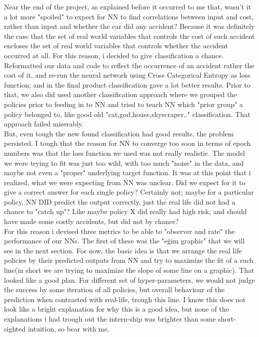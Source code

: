 \documentclass[titlepage, a4paper, 14pt]{extarticle} %
\begin{document}
Near the end of the project, as explained before it occurred to me that, wasn't it a lot more "spoiled" to expect for NN to find correlations between input and cost, rather than input and whether the car did any accident? Because it was definitely the case that the set of real world variables that controls the cost of such accident encloses the set of real world variables that controls whether the accident occurred at all. For this reason, i decided to give classification a chance. Reformatted our data and code to reflect the occurrence of an accident rather the cost of it, and re-run the neural network using Cross Categorical Entropy as loss function; and in the final product classification gave a lot better results. Prior to that, we also did used another classification approach where we grouped the policies prior to feeding in to NN and tried to teach NN which "prior group" a policy belonged to, like good old "cat,god,house,skyscraper.." classification. That approach failed miserably.\\

But, even tough the new found classification had good results, the problem persisted. I tough that the reason for NN to converge too soon in terms of epoch numbers was that the loss function we used was not really realistic. The model we were trying to fit was just too wild, with too much "noise" in the data, and maybe not even a "proper" underlying target function. It was at this point that i realized, what we were expecting from NN was unclear. Did we expect for it to give a correct answer for each single policy? Certainly not; maybe for a particular policy, NN DID predict the output correctly, just the real life did not had a chance to "catch up"? Like maybe policy X did really had high risk, and should have made some costly accidents, but did not by chance?\\

For this reason i devised three metrics to be able to "observer and rate" the performance of our NNs. The first of these was the "eğim graphic" that we will see in the next section. For now, the basic idea is that we arrange the real life policies by their predicted outputs from NN and try to maximize the fit of a such line(in short we are trying to maximize the slope of some line on a graphic). That looked like a good plan. For different set of hyper-parameters, we would not judge the success by some iteration of all policies, but overall behaviour of the prediction when contrasted with real-life, trough this line. I know this does not look like a bright explanation for why this is a good idea, but none of the explanations i had trough out the intern-ship was brighter than some short-sighted intuition, so bear with me. \\
 
\end{document}
